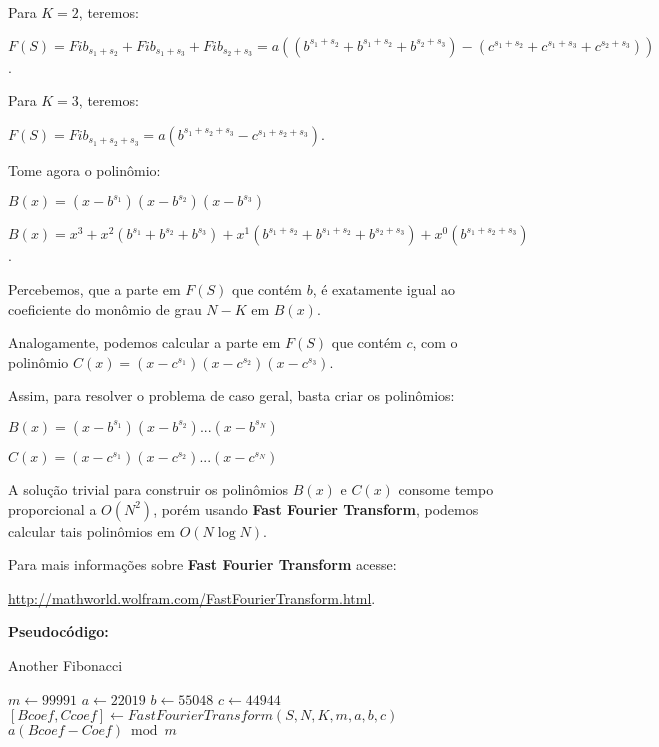 Para $K=2$, teremos:

$F(S) = Fib_{s_1+s_2}+Fib_{s_1+s_3}+Fib_{s_2+s_3} = a((b^{s_1+s_2}+b^{s_1+s_2}+b^{s_2+s_3}) - (c^{s_1+s_2}+c^{s_1+s_3}+c^{s_2+s_3}))$.

Para $K=3$, teremos:

$F(S) = Fib_{s_1+s_2+s_3} = a(b^{s_1+s_2+s_3} - c^{s_1+s_2+s_3})$.
\newline

Tome agora o polinômio: 

$B(x) = (x-b^{s_1})(x-b^{s_2})(x-b^{s_3})$

$B(x) = x^3 + x^2(b^{s_1}+b^{s_2}+b^{s_3}) + x^1(b^{s_1+s_2}+b^{s_1+s_2}+b^{s_2+s_3}) + x^0(b^{s_1+s_2+s_3})$.

Percebemos, que a parte em $F(S)$ que contém $b$, é exatamente igual ao coeficiente do monômio de grau $N-K$ em $B(x)$.

Analogamente, podemos calcular a parte em $F(S)$ que contém $c$, com o polinômio $C(x) = (x-c^{s_1})(x-c^{s_2})(x-c^{s_3})$.
\newline

Assim, para resolver o problema de caso geral, basta criar os polinômios:

$B(x) = (x-b^{s_1})(x-b^{s_2})...(x-b^{s_N})$

$C(x) = (x-c^{s_1})(x-c^{s_2})...(x-c^{s_N})$
\newline

A solução trivial para construir os polinômios $B(x)$ e $C(x)$ consome tempo proporcional a $O(N^2)$, porém usando 
\textbf{Fast Fourier Transform}, podemos calcular tais polinômios em $O(N\log N)$.
\newline

Para mais informações sobre  \textbf{Fast Fourier Transform} acesse:

\href{http://mathworld.wolfram.com/FastFourierTransform.html}{http://mathworld.wolfram.com/FastFourierTransform.html}.
\newline

\textbf{Pseudocódigo:}
\begin{algorithm}
\caption{Another Fibonacci}
\begin{algorithmic}[1]
\State $m \gets 99991$
\State $a \gets 22019$
\State $b \gets 55048$
\State $c \gets 44944$
\\
\State $[Bcoef, Ccoef]\gets FastFourierTransform(S,N,K,m,a,b,c)$ 
\\
\State \Return $a(Bcoef - Coef)\bmod m$

\EndProcedure
\end{algorithmic}
\end{algorithm}


